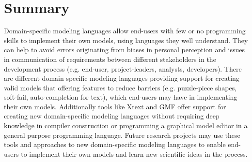 \documentclass[runningheads,a4paper]{llncs}
\begin{document}
\section{Summary}\label{sec:summary}
Domain-specific modeling languages allow end-users with few or no programming skills 
to implement their own models, using languages they well understand. 
They can help to  avoid errors originating from biases in personal perception 
and issues in communication of requirements between different stakeholders in the development process (e.g. end-user, project-leaders, analysts, developers). 
There are different domain specific modeling languages providing support for creating valid models that
offering features to reduce  barriers (e.g. puzzle-piece shapes, soft-fail, auto-completion for text), which 
end-users  may have in implementing their own models. Additionally tools like Xtext and GMF offer support for creating new domain-specific modeling languages 
without requiring deep knowledge in compiler construction or programming a graphical model editor in a general purpose programming language.
Future research projects may use these tools and approaches to new domain-specific modeling languages to enable 
end-users to implement their own models and learn new scientific ideas in the process.
% 
% 

%
%
\printbibliography
\end{document}
